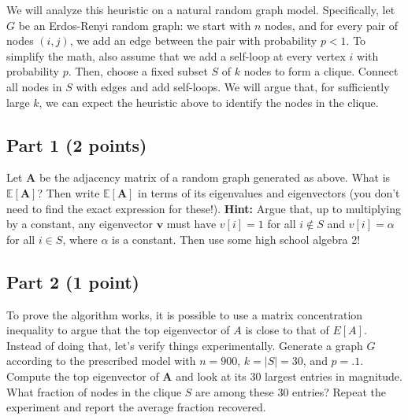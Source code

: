 \documentclass{article}
\begin{document}
We will analyze this heuristic on a natural random graph model. Specifically, let $G$ be an Erdos-Renyi random graph: we start with $n$ nodes, and for every pair of nodes $(i,j)$, we add an edge between the pair with probability $p < 1$. To simplify the math, also assume that we add a self-loop at every vertex $i$ with probability $p$. Then, choose a fixed subset $S$ of $k$ nodes to form a clique. Connect all nodes in $S$ with edges and add self-loops. We will argue that, for sufficiently large $k$, we can expect the heuristic above to identify the nodes in the clique. 

\subsection*{Part 1 (2 points)}
Let $\mathbf{A}$ be the adjacency matrix of a random graph generated as above.
What is $\mathbb{E}[\mathbf{A}]$?
Then write $\mathbb{E}[\mathbf{A}]$ in terms of its eigenvalues and eigenvectors (you don't need to find the exact expression for these!).
\textbf{Hint:} Argue that, up to multiplying by a constant, any eigenvector $\mathbf{v}$ must have $v[i] = 1$ for all $i \notin S$ and $v[i] = \alpha$ for all $i\in S$, where $\alpha$ is a constant. Then use some high school algebra 2!

\subsection*{Part 2 (1 point)}
To prove the algorithm works, it is possible to use a matrix concentration inequality to argue that the top eigenvector of $A$ is close to that of $E[A]$. Instead of doing that, let's verify things experimentally. Generate a graph $G$ according to the prescribed model with $n = 900$, $k = 
|S|= 30$, and $p = .1$. Compute the top eigenvector of $\mathbf{A}$ and look at its 30 largest
entries in magnitude. What fraction of nodes in the clique $S$ are among these 30 entries? Repeat the experiment and report the average fraction recovered. 

%
\end{document}
